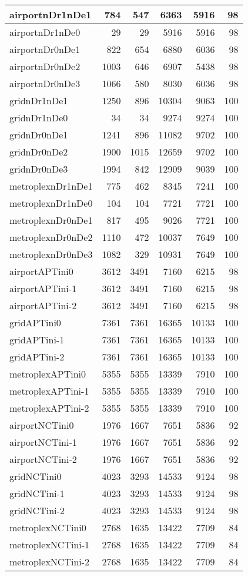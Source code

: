 \begin{longtable}{|l|r|r|r|r|r|}
\endlastfoot
airportnDr1nDe1 & 784 & 547 & 6363 & 5916 & 98 \\ \hline
airportnDr1nDe0 & 29 & 29 & 5916 & 5916 & 98 \\ \hline
airportnDr0nDe1 & 822 & 654 & 6880 & 6036 & 98 \\ \hline
airportnDr0nDe2 & 1003 & 646 & 6907 & 5438 & 98 \\ \hline
airportnDr0nDe3 & 1066 & 580 & 8030 & 6036 & 98 \\ \hline
gridnDr1nDe1 & 1250 & 896 & 10304 & 9063 & 100 \\ \hline
gridnDr1nDe0 & 34 & 34 & 9274 & 9274 & 100 \\ \hline
gridnDr0nDe1 & 1241 & 896 & 11082 & 9702 & 100 \\ \hline
gridnDr0nDe2 & 1900 & 1015 & 12659 & 9702 & 100 \\ \hline
gridnDr0nDe3 & 1994 & 842 & 12909 & 9039 & 100 \\ \hline
metroplexnDr1nDe1 & 775 & 462 & 8345 & 7241 & 100 \\ \hline
metroplexnDr1nDe0 & 104 & 104 & 7721 & 7721 & 100 \\ \hline
metroplexnDr0nDe1 & 817 & 495 & 9026 & 7721 & 100 \\ \hline
metroplexnDr0nDe2 & 1110 & 472 & 10037 & 7649 & 100 \\ \hline
metroplexnDr0nDe3 & 1082 & 329 & 10931 & 7649 & 100 \\ \hline
airportAPTini0 & 3612 & 3491 & 7160 & 6215 & 98 \\ \hline
airportAPTini-1 & 3612 & 3491 & 7160 & 6215 & 98 \\ \hline
airportAPTini-2 & 3612 & 3491 & 7160 & 6215 & 98 \\ \hline
gridAPTini0 & 7361 & 7361 & 16365 & 10133 & 100 \\ \hline
gridAPTini-1 & 7361 & 7361 & 16365 & 10133 & 100 \\ \hline
gridAPTini-2 & 7361 & 7361 & 16365 & 10133 & 100 \\ \hline
metroplexAPTini0 & 5355 & 5355 & 13339 & 7910 & 100 \\ \hline
metroplexAPTini-1 & 5355 & 5355 & 13339 & 7910 & 100 \\ \hline
metroplexAPTini-2 & 5355 & 5355 & 13339 & 7910 & 100 \\ \hline
airportNCTini0 & 1976 & 1667 & 7651 & 5836 & 92 \\ \hline
airportNCTini-1 & 1976 & 1667 & 7651 & 5836 & 92 \\ \hline
airportNCTini-2 & 1976 & 1667 & 7651 & 5836 & 92 \\ \hline
gridNCTini0 & 4023 & 3293 & 14533 & 9124 & 98 \\ \hline
gridNCTini-1 & 4023 & 3293 & 14533 & 9124 & 98 \\ \hline
gridNCTini-2 & 4023 & 3293 & 14533 & 9124 & 98 \\ \hline
metroplexNCTini0 & 2768 & 1635 & 13422 & 7709 & 84 \\ \hline
metroplexNCTini-1 & 2768 & 1635 & 13422 & 7709 & 84 \\ \hline
metroplexNCTini-2 & 2768 & 1635 & 13422 & 7709 & 84 \\ \hline
\end{longtable}
